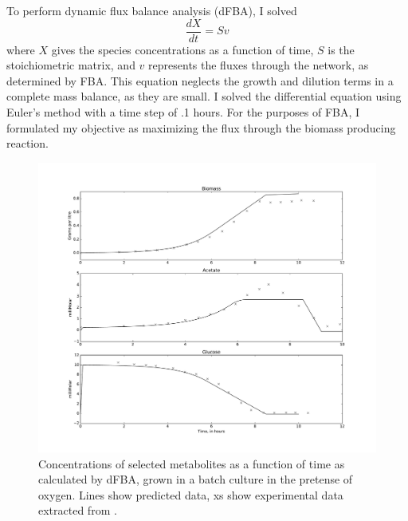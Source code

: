 \documentclass{article}
\begin{document}
To perform dynamic flux balance analysis (dFBA), I solved
\begin{equation}
\frac{dX}{dt} = Sv
\end{equation}
where $X$ gives the species concentrations as a function of time, $S$ is the stoichiometric matrix, and $v$ represents the fluxes through the network, as determined by FBA. This equation neglects the growth and dilution terms in a complete mass balance, as they are small. I solved the differential equation using Euler's method with a time step of .1 hours.  For the purposes of FBA, I formulated my objective as maximizing the flux through the biomass producing reaction.
\begin{figure}[!h]
\includegraphics[width=18cm]{../MikesNewNetwork/figures/AttemptToRecreateFig7}
\caption{Concentrations of selected metabolites as a function of time as calculated by dFBA, grown in a batch culture in the pretense of oxygen. Lines show predicted data, xs show experimental data extracted from \cite{varma1994stoichiometric}.}
\label{fig:aerobic}
\end{figure}
\end{document}
